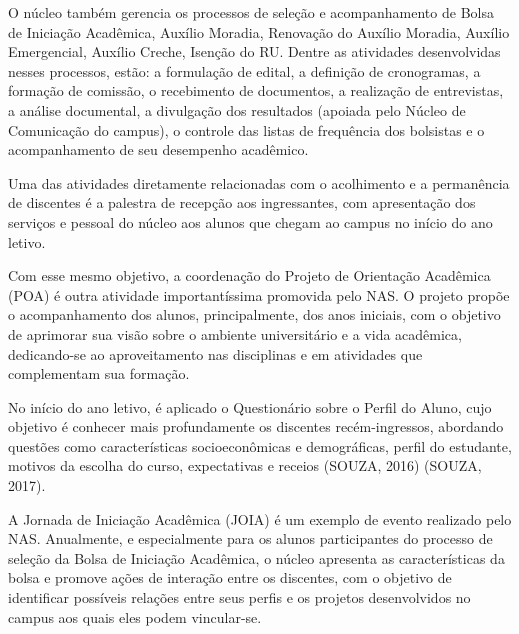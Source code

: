 O núcleo também gerencia os processos de seleção e acompanhamento de Bolsa de Iniciação Acadêmica, Auxílio Moradia, Renovação do Auxílio Moradia, Auxílio Emergencial, Auxílio Creche, Isenção do RU. Dentre as atividades desenvolvidas nesses processos, estão: a formulação de edital, a definição de cronogramas, a formação de comissão, o recebimento de documentos, a realização de entrevistas, a análise documental, a divulgação dos resultados (apoiada pelo Núcleo de Comunicação do campus), o controle das listas de frequência dos bolsistas e o acompanhamento de seu desempenho acadêmico. %

Uma das atividades diretamente relacionadas com o acolhimento e a permanência de discentes é a palestra de recepção aos ingressantes, com apresentação dos serviços e pessoal do núcleo aos  alunos que chegam ao campus no início do ano letivo. %

Com esse mesmo objetivo, a coordenação do Projeto de Orientação Acadêmica (POA) é outra atividade importantíssima promovida pelo NAS. O projeto propõe o acompanhamento dos alunos, principalmente, dos anos iniciais, com o objetivo de aprimorar sua visão sobre o ambiente universitário e a vida acadêmica, dedicando-se ao aproveitamento nas disciplinas e em atividades que complementam sua formação. %

No início do ano letivo, é aplicado o Questionário sobre o Perfil do Aluno, cujo objetivo é conhecer mais profundamente os discentes recém-ingressos, abordando questões como características socioeconômicas e demográficas, perfil do estudante, motivos da escolha do curso, expectativas e receios (SOUZA, 2016) (SOUZA, 2017).

A Jornada de Iniciação Acadêmica (JOIA) é um exemplo de evento realizado pelo NAS. Anualmente, e especialmente para os alunos participantes do processo de seleção da Bolsa de Iniciação Acadêmica, o núcleo apresenta as características da bolsa e promove ações de interação entre os discentes, com o objetivo de identificar possíveis relações entre seus perfis e os projetos desenvolvidos no campus aos quais eles podem vincular-se. %

